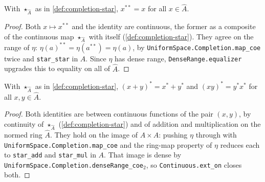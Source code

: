 \begin{lemma}
    \label{lmm:completion-star-involutive}
    With $\star_{\widehat{A}}$ as in \ref{def:completion-star}, $x^{**} = x$ for all $x \in \widehat{A}$.
\end{lemma}
\begin{proof}
    Both $x \mapsto x^{**}$ and the identity are continuous, the former as a composite of the continuous map $\star_{\widehat{A}}$ with itself (\ref{def:completion-star}). They agree on the range of $\eta$: $\eta(a)^{**} = \eta(a^{**}) = \eta(a)$, by \texttt{UniformSpace.Completion.map\_coe} twice and \texttt{star\_star} in $A$. Since $\eta$ has dense range, \texttt{DenseRange.equalizer} upgrades this to equality on all of $\widehat{A}$.
\end{proof}

\begin{lemma}
    \label{lmm:completion-star-add-mul}
    With $\star_{\widehat{A}}$ as in \ref{def:completion-star}, $(x+y)^{*} = x^{*} + y^{*}$ and $(xy)^{*} = y^{*} x^{*}$ for all $x, y \in \widehat{A}$.
\end{lemma}
\begin{proof}
    Both identities are between continuous functions of the pair $(x,y)$, by continuity of $\star_{\widehat{A}}$ (\ref{def:completion-star}) and of addition and multiplication on the normed ring $\widehat{A}$. They hold on the image of $A \times A$: pushing $\eta$ through with \texttt{UniformSpace.Completion.map\_coe} and the ring-map property of $\eta$ reduces each to \texttt{star\_add} and \texttt{star\_mul} in $A$. That image is dense by \texttt{UniformSpace.Completion.denseRange\_coe\ensuremath{_2}}, so \texttt{Continuous.ext\_on} closes both.
\end{proof}


